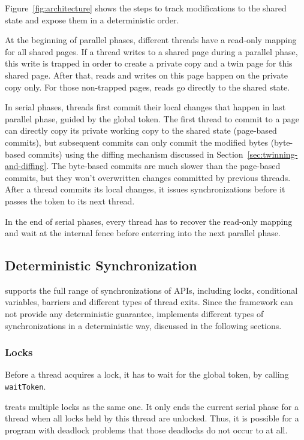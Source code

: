 Figure~\ref{fig:architecture} shows the steps to track modifications to the shared state and expose them in a deterministic order.  

At the beginning of parallel phases, different threads have a read-only mapping for all shared pages. If a thread writes to a shared page during a parallel phase, this write is trapped in order to create a private copy and a twin page for this shared page. After that, reads and writes on this page happen on the private copy only. For those non-trapped pages, reads go directly to the shared state.  

In serial phases, threads first commit their local changes that happen in last parallel phase, guided by the global token.  The first thread to commit to a page can directly copy its private working copy to the shared state (page-based commits), but subsequent commits can only commit the modified bytes (byte-based commits) using the diffing mechanism discussed in Section~\ref{sec:twinning-and-diffing}. The byte-based commits are much slower than the page-based commits, but  they won't overwritten changes committed by previous threads.  After a thread commits its local changes, it issues synchronizations before it passes the token to its next thread. 

In the end of serial phases, every thread has to recover the read-only mapping and wait at the internal fence before enterring into the next parallel phase. 

\subsection{Deterministic Synchronization}
\label{sec:synchronization}

\dthreads{} supports the full range of synchronizations of \pthreads{} APIs, including locks, conditional variables, barriers and different types of thread exits. Since the \sheriff{} framework can not provide any deterministic guarantee, \dthreads{} implements different types of synchronizations in a deterministic way, discussed in the following sections. 

\subsubsection{Locks}
Before a thread acquires a lock, it has to wait for the global token, by calling \texttt{waitToken}. 

\dthreads{} treats multiple locks as the same one. It only ends the current serial phase for a thread when all locks held by this thread are unlocked. Thus, it is possible for a program with deadlock problems that those deadlocks do not occur to \dthreads{} at all. 

